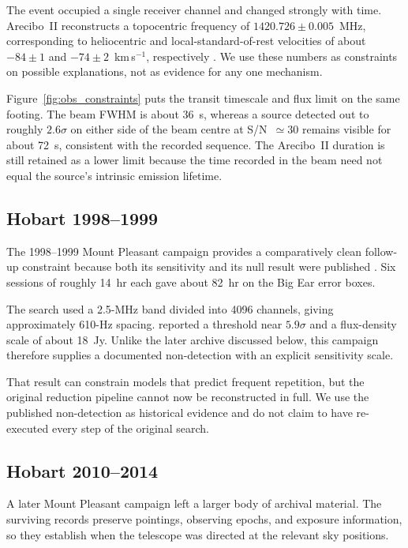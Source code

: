 \documentclass[crop]{CSL}
\begin{document}
The event occupied a single receiver channel and changed strongly with time. Arecibo~II reconstructs a topocentric frequency of $1420.726\pm0.005$~MHz, corresponding to heliocentric and local-standard-of-rest velocities of about $-84\pm1$ and $-74\pm2$~km\,s$^{-1}$, respectively \citep{mendez2025}. We use these numbers as constraints on possible explanations, not as evidence for any one mechanism.

Figure~\ref{fig:obs_constraints} puts the transit timescale and flux limit on the same footing. The beam FWHM is about 36~s, whereas a source detected out to roughly $2.6\sigma$ on either side of the beam centre at S/N~$\simeq30$ remains visible for about 72~s, consistent with the recorded sequence. The Arecibo~II duration is still retained as a lower limit because the time recorded in the beam need not equal the source's intrinsic emission lifetime.

\subsection{Hobart 1998--1999}

The 1998--1999 Mount Pleasant campaign provides a comparatively clean follow-up constraint because both its sensitivity and its null result were published \citep{gray2002}. Six sessions of roughly 14~hr each gave about 82~hr on the Big Ear error boxes.

The search used a 2.5-MHz band divided into 4096 channels, giving approximately 610-Hz spacing. \citet{gray2002} reported a threshold near $5.9\sigma$ and a flux-density scale of about 18~Jy. Unlike the later archive discussed below, this campaign therefore supplies a documented non-detection with an explicit sensitivity scale.

That result can constrain models that predict frequent repetition, but the original reduction pipeline cannot now be reconstructed in full. We use the published non-detection as historical evidence and do not claim to have re-executed every step of the original search.

\subsection{Hobart 2010--2014}

A later Mount Pleasant campaign left a larger body of archival material. The surviving records preserve pointings, observing epochs, and exposure information, so they establish when the telescope was directed at the relevant sky positions.
\end{document}
